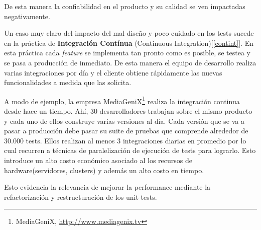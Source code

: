 \par De esta manera la confiabilidad en el producto y su calidad se ven impactadas negativamente. 

\par Un caso muy claro del impacto del mal diseño y poco cuidado en los tests sucede en la práctica de \textbf{Integración Contínua} (Continuous Integration)[\ref{contint}]. En esta práctica cada \emph{feature} se implementa tan pronto como es posible, se testea y se pasa a producción de inmediato. De esta manera el equipo de desarrollo realiza varias integraciones por día y el cliente obtiene rápidamente las nuevas funcionalidades a medida que las solicita. \\

\par A modo de ejemplo, la empresa MediaGeniX\footnote{MediaGeniX, \url{http://www.mediagenix.tv}} realiza la integración continua desde hace un tiempo. Ahí, 30 desarrolladores trabajan sobre el mismo producto y cada uno de ellos construye varias versiones al día. Cada versión que se va a pasar a producción debe pasar su suite de pruebas que comprende alrededor de 30.000 tests. Ellos realizan al menos 3 integraciones diarias en promedio por lo cual recurren a técnicas de paralelización de ejecución de tests para lograrlo. Esto introduce un alto costo económico asociado al los recursos de hardware(servidores, clusters) y además un alto costo en tiempo.\\

\par Esto evidencia la relevancia de mejorar la performance mediante la refactorización y restructuración de los unit tests.
